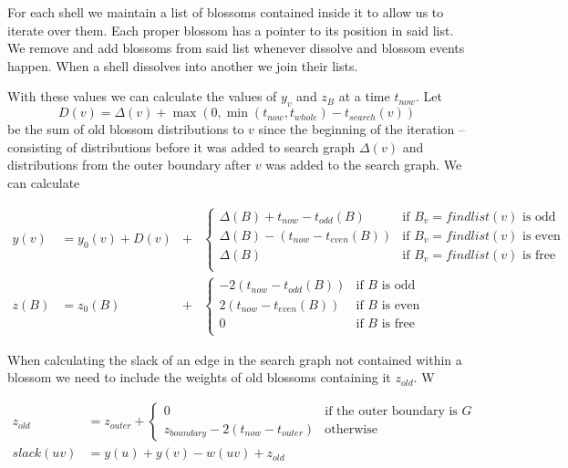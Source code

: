 For each shell we maintain a list of blossoms contained inside it to allow us to iterate over them. Each proper blossom has a pointer to its position in said list. We remove and add blossoms from said list whenever dissolve and blossom events happen. When a shell dissolves into another we join their lists.

With these values we can calculate the values of $y_v$ and $z_B$ at a time $t_{now}$. Let 
\[ D(v) = \Delta(v) + \max(0, \min(t_{now}, t_{whole}) - t_{search}(v)) \] 
be the sum of old blossom distributions to $v$ since the beginning of the iteration – consisting of distributions before it was added to search graph $\Delta(v)$ and distributions from the outer boundary after $v$ was added to the search graph. We can calculate

\begin{align*}
    y(v) &= y_0(v) + D(v) &+ 
    &\begin{cases}
        \Delta(B) + t_{now} - t_{odd}(B) & \text{if $B_v = findlist(v)$ is odd} \\
        \Delta(B) - (t_{now} - t_{even}(B)) & \text{if $B_v = findlist(v)$ is even} \\
        \Delta(B) & \text{if $B_v = findlist(v)$ is free} \\
    \end{cases} \\
    z(B) &= z_0(B) &+ 
    &\begin{cases}
        -2(t_{now} - t_{odd}(B)) & \text{if $B$ is odd} \\
        2(t_{now} - t_{even}(B)) & \text{if $B$ is even} \\
        0 & \text{if $B$ is free} \\
    \end{cases}
\end{align*}

When calculating the slack of an edge in the search graph not contained within a blossom we need to include the weights of old blossoms containing it $z_{old}$. W

\begin{align*}
    z_{old} &= z_{outer} + \begin{cases}
        0 & \text{if the outer boundary is $G$} \\
        z_{boundary} - 2(t_{now} - t_{outer}) & \text{otherwise}
    \end{cases} \\
    slack(uv) &= y(u) + y(v) - w(uv) + z_{old}
\end{align*}

